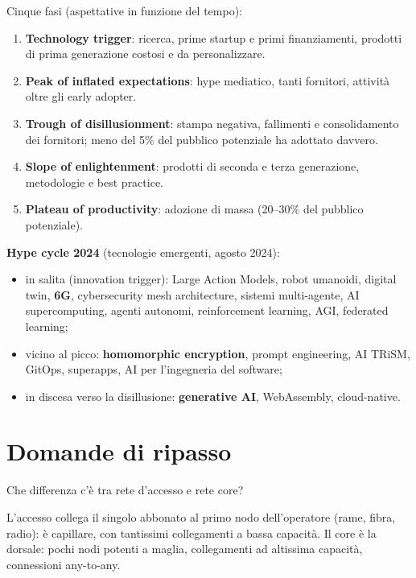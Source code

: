 Cinque fasi (aspettative in funzione del tempo):

\begin{enumerate}
\def\labelenumi{\arabic{enumi}.}
\tightlist
\item
  \textbf{Technology trigger}: ricerca, prime startup e primi finanziamenti, prodotti di prima generazione costosi e da personalizzare.
\item
  \textbf{Peak of inflated expectations}: hype mediatico, tanti fornitori, attività oltre gli early adopter.
\item
  \textbf{Trough of disillusionment}: stampa negativa, fallimenti e consolidamento dei fornitori; meno del 5\% del pubblico potenziale ha adottato davvero.
\item
  \textbf{Slope of enlightenment}: prodotti di seconda e terza generazione, metodologie e best practice.
\item
  \textbf{Plateau of productivity}: adozione di massa (20--30\% del pubblico potenziale).
\end{enumerate}

\textbf{Hype cycle 2024} (tecnologie emergenti, agosto 2024):

\begin{itemize}
\tightlist
\item
  in salita (innovation trigger): Large Action Models, robot umanoidi, digital twin, \textbf{6G}, cybersecurity mesh architecture, sistemi multi-agente, AI supercomputing, agenti autonomi, reinforcement learning, AGI, federated learning;
\item
  vicino al picco: \textbf{homomorphic encryption}, prompt engineering, AI TRiSM, GitOps, superapps, AI per l'ingegneria del software;
\item
  in discesa verso la disillusione: \textbf{generative AI}, WebAssembly, cloud-native.
\end{itemize}

\section{Domande di ripasso}

\begin{approfondimento}{Che differenza c'è tra rete d'accesso e rete core?}

L'accesso collega il singolo abbonato al primo nodo dell'operatore (rame, fibra, radio): è capillare, con tantissimi collegamenti a bassa capacità. Il core è la dorsale: pochi nodi potenti a maglia, collegamenti ad altissima capacità, connessioni any-to-any.

\end{approfondimento}

